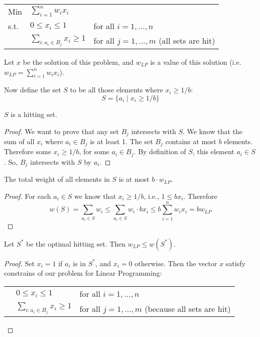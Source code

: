 \documentclass[12pt]{article}
\begin{document}
\begin{enumerate}
{\begin{tabular}{lll}
  Min   & $\sum\limits_{i=1}^n w_i x_i$ \\
  s.t.
        & $0\le x_i \le 1$  & for all $i=1,\dots, n$ \\
        & $\sum\limits_{i:a_i\in B_j} x_i \ge 1$ & for all $j=1,\dots, m$  (all sets
        are hit) \\
\end{tabular}

Let $x$ be the solution of this problem, and $w_{LP}$ is a value of
this solution (i.e. $w_{LP}=\sum_{i=1}^n w_i x_i$).

Now define the set $S$ to be all
those elements where $x_i \ge 1/b$:
$$ S = \{ a_i \mid  x_i \ge 1/b \}$$

\begin{claim}
  $S$ is a hitting set.
\end{claim}

\begin{proof}
  We want to prove that any set $B_j$ intersects with $S$.
  We know that the sum of all $x_i$ where $a_i \in B_j$ is at least 1.
  The set $B_j$ contains at most $b$ elements.
  Therefore some $x_i \ge 1/b$, for some $a_i \in B_j$.
  By definition of $S$, this element $a_i \in S$.
  So, $B_j$ intersects with $S$ by $a_i$.
\end{proof}

\begin{claim}
  The total weight of all elements in $S$ is at most $b \cdot w_{LP}$.
\end{claim}

\begin{proof}
  For each $a_i\in S$ we know that $x_i \ge 1/b$, i.e., $1\le bx_i$.
  Therefore
  $$w(S) = \sum_{a_i\in S} w_i \le \sum_{a_i\in S} w_i \cdot b x_i \le
  b \sum_{i=1}^n w_i x_i = b w_{LP}$$
\end{proof}


\begin{claim}
  Let $S^*$ be the optimal hitting set. Then  $w_{LP} \le w(S^*)$.
\end{claim}

\begin{proof}
  Set $x_i=1$ if $a_i$ is in $S^*$, and $x_i=0$ otherwise.
  Then the vector $x$ satisfy constrains of our problem for Linear Programming:


\begin{tabular}{lll}
        & $0\le x_i \le 1$  & for all $i=1,\dots, n$ \\
        & $\sum\limits_{i:a_i\in B_j} x_i \ge 1$ & for all $j=1,\dots, m$
        (because all sets  are hit) \\
\end{tabular}


\end{proof}}
\end{enumerate}
\end{document}
